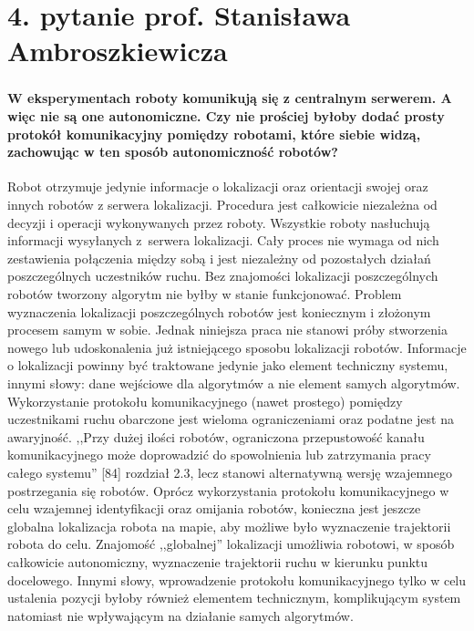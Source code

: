 \section*{4. pytanie prof. Stanisława Ambroszkiewicza}
\begin{frame}
\frametitle{\secname}
\framesubtitle{\tiny{W eksperymentach roboty komunikują się z centralnym serwerem. A więc nie są one autonomiczne.  Czy nie prościej byłoby dodać prosty protokół komunikacyjny pomiędzy robotami, które siebie widzą, zachowując w ten sposób autonomiczność robotów?}}
\tiny

Robot otrzymuje jedynie informacje o lokalizacji  oraz orientacji swojej oraz innych robotów z serwera lokalizacji. Procedura jest całkowicie niezależna od decyzji i operacji  wykonywanych przez roboty. Wszystkie roboty nasłuchują informacji wysyłanych z~serwera lokalizacji. Cały proces nie wymaga od nich zestawienia połączenia między sobą i jest niezależny od pozostałych działań poszczególnych uczestników ruchu. 
\newline
\newline
Bez znajomości lokalizacji poszczególnych robotów tworzony algorytm nie byłby w stanie funkcjonować. Problem wyznaczenia lokalizacji poszczególnych robotów jest koniecznym i złożonym procesem samym w sobie. Jednak niniejsza praca nie stanowi próby stworzenia nowego lub udoskonalenia już istniejącego sposobu lokalizacji robotów. Informacje o lokalizacji powinny być traktowane jedynie jako element techniczny systemu, innymi słowy: dane wejściowe dla algorytmów a nie element samych algorytmów.
\newline
\newline
Wykorzystanie protokołu komunikacyjnego (nawet prostego) pomiędzy uczestnikami ruchu obarczone jest wieloma ograniczeniami oraz podatne jest na awaryjność. ,,Przy dużej ilości robotów, ograniczona przepustowość kanału komunikacyjnego może doprowadzić do spowolnienia lub zatrzymania pracy całego systemu'' [84] rozdział 2.3, lecz stanowi alternatywną wersję wzajemnego postrzegania się robotów. Oprócz wykorzystania protokołu komunikacyjnego w celu wzajemnej identyfikacji oraz omijania robotów, konieczna jest jeszcze globalna lokalizacja robota na mapie, aby możliwe było wyznaczenie trajektorii robota do celu. Znajomość ,,globalnej'' lokalizacji umożliwia robotowi, w sposób całkowicie autonomiczny, wyznaczenie trajektorii ruchu w kierunku punktu docelowego. 
\newline
\newline
Innymi słowy, wprowadzenie protokołu komunikacyjnego tylko w celu ustalenia pozycji byłoby również elementem technicznym, komplikującym system natomiast nie wpływającym na działanie samych algorytmów.

\end{frame}
